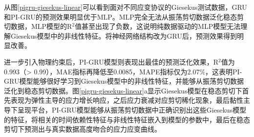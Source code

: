 从图\ref{pigru-giesekus-linear}可以看到面对不同应变协议的Giesekus测试数据，GRU和PI-GRU的预测效果明显优于MLP。MLP完全无法从振荡剪切数据泛化稳态剪切数据，MLP模型的R$^2$值甚至出现了负数，这说明纯数据驱动的MLP模型无法理解Giesekus模型中的非线性特征。将神经网络结构改为GRU后，预测效果得到明显改善。

进一步引入物理约束后，PI-GRU模型则表现出最佳的预测泛化效果，R$^2$值为0.993（> 0.99），MAE指标再降低至0.0085，MAPE指标仅为2.07\%，这表明PI-GRU模型能够很好学习到Giesekus模型中的非线性特征，并能够从振荡剪切数据泛化到稳态剪切数据。图\ref{pigru-giesekus-linear}a显示Giesekus模型在稳态剪切下首先表现为弹性主导的应力增长响应，之后应力衰减对应剪切稀化现象，最后黏性主导下呈现平台，PI-GRU模型能够从振荡剪切数据中正确识别出这些Giesekus模型的特征，将相关的时间依赖性特征与非线性特征嵌入到模型的参数中，最后在稳态剪切下预测出与真实数据高度吻合的应力应变曲线。

